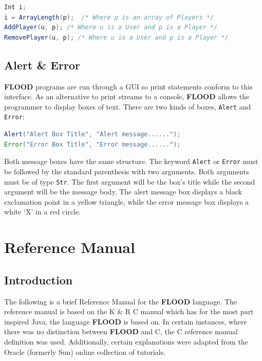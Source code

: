 \documentclass[12pt]{report}
\begin{document}
\begin{singlespace}
\begin{lstlisting}[language=Java,label=some-code,caption={Some FLOOD utility functions and usage.}]
Int i;
i = ArrayLength(p);  /* Where p is an array of Players */
AddPlayer(u, p); /* Where u is a User and p is a Player */
RemovePlayer(u, p); /* Where u is a User and p is a Player */
\end{lstlisting}
\end{singlespace}

\section{Alert \& Error}

\textbf{FLOOD} programs are run through a GUI so print statements conform to this interface. As an alternative to print streams to a console, \textbf{FLOOD} allows the programmer to display boxes of text. There are two kinds of boxes, \texttt{Alert} and \texttt{Error}:

\begin{singlespace}
\begin{lstlisting}[language=Java,label=some-code,caption={Launching \texttt{Alert} and \texttt{Error} message boxes.}]
Alert("Alert Box Title", "Alert message......");
Error("Error Box Title", "Error message......");
\end{lstlisting}
\end{singlespace}

Both message boxes have the same structure. The keyword \texttt{Alert} or \texttt{Error} must be followed by the standard parenthesis with two arguments. Both arguments must be of type \texttt{Str}. The first argument will be the box's title while the second argument will be the message body. The alert message box displays a black exclamation point in a yellow triangle, while the error message box displays a white `X' in a red circle.

\chapter{Reference Manual}

\section{Introduction}

The following is a brief Reference Manual for the \textbf{FLOOD} language. The reference manual is based on the K \& R C manual which has for the most part inspired Java, the language \textbf{FLOOD} is based on. In certain instances, where there was no distinction between \textbf{FLOOD} and C, the C reference manual definition was used. Additionally, certain explanations were adapted from the Oracle (formerly Sun) online collection of tutorials.
\end{document}
